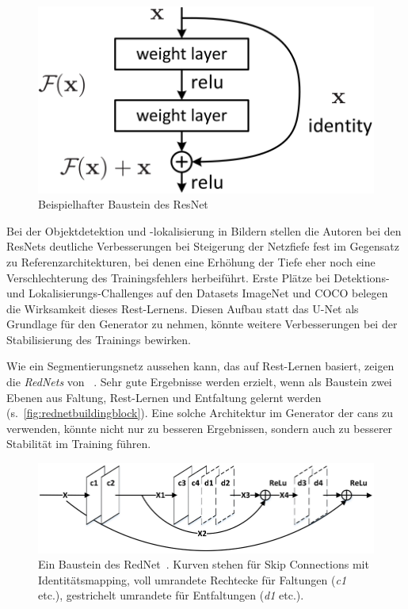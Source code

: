 \begin{figure}
	\centering
	\includegraphics[width=0.5\linewidth]{img/resnet_building_block}
	\caption[Beispielhafter Baustein des ResNet]{Beispielhafter Baustein des ResNet~\cite{He.2016}}
	\label{fig:resnetbuildingblock}
\end{figure}

Bei der Objektdetektion und -lokalisierung in Bildern stellen die Autoren bei den ResNets deutliche Verbesserungen bei Steigerung der Netzfiefe fest im Gegensatz zu Referenzarchitekturen, bei denen eine Erhöhung der Tiefe eher noch eine Verschlechterung des Trainingsfehlers herbeiführt.
Erste Plätze bei Detektions- und Lokalisierungs-Challenges auf den Datasets ImageNet und COCO belegen die Wirksamkeit dieses Rest-Lernens.
Diesen Aufbau statt das U-Net als Grundlage für den Generator zu nehmen, könnte weitere Verbesserungen bei der Stabilisierung des Trainings bewirken.

Wie ein Segmentierungsnetz aussehen kann, das auf Rest-Lernen basiert, zeigen die \emph{RedNets} von \citeauthor{Mao.2016}~\cite{Mao.2016}.
Sehr gute Ergebnisse werden erzielt, wenn als Baustein zwei Ebenen aus Faltung, Rest-Lernen und Entfaltung gelernt werden (s.~\autoref{fig:rednetbuildingblock}).
Eine solche Architektur im Generator der \glspl{can} zu verwenden, könnte nicht nur zu besseren Ergebnissen, sondern auch zu besserer Stabilität im Training führen.

\begin{figure}
	\centering
	\includegraphics[width=0.8\linewidth]{img/rednet_building_block}
	\caption[Ein Baustein des RedNet]{Ein Baustein des RedNet~\cite{Mao.2016}. Kurven stehen für Skip Connections mit Identitätsmapping, voll umrandete Rechtecke für Faltungen (\emph{c1} etc.), gestrichelt umrandete für Entfaltungen (\emph{d1} etc.).}
	\label{fig:rednetbuildingblock}
\end{figure}



